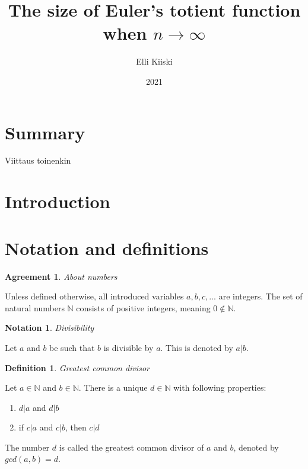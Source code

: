 \documentclass{article}
\title{The size of Euler's totient function when $n \rightarrow \infty$}
\author{Elli Kiiski}
\date{2021}
\theoremstyle{definition}
\newtheorem{definition}[subsection]{Definition}
\newtheorem{notation}[subsection]{Notation}
\newtheorem{agreement}[subsection]{Agreement}
\begin{document}
\maketitle

\newpage

\section{Summary}

Viittaus \cite{HardyWright} toinenkin \cite{Saksman}

\section{Introduction}

\section{Notation and definitions}

\begin{agreement}{\emph{About numbers}}

Unless defined otherwise, all introduced variables $a, b, c, ...$ are integers. The set of natural numbers $\mathbb{N}$ consists of positive integers, meaning $0 \not\in \mathbb{N}$.

\end{agreement}

\begin{notation}{\emph{Divisibility}}

Let $a$ and $b$ be such that $b$ is divisible by $a$. This is denoted by $a \vert b$.

\end{notation}

\begin{definition}{\emph{Greatest common divisor}}

Let $a \in \mathbb{N}$ and $b \in \mathbb{N}$. There is a unique $d \in \mathbb{N}$ with following properties:

\begin{enumerate}
 \item $d \vert a$ and $d \vert b$
 \item if $c \vert a$ and $c \vert b$, then $c \vert d$
\end{enumerate}

The number $d$ is called the greatest common divisor of $a$ and $b$, denoted by $gcd(a,b) = d$.

\end{definition}
\end{document}
